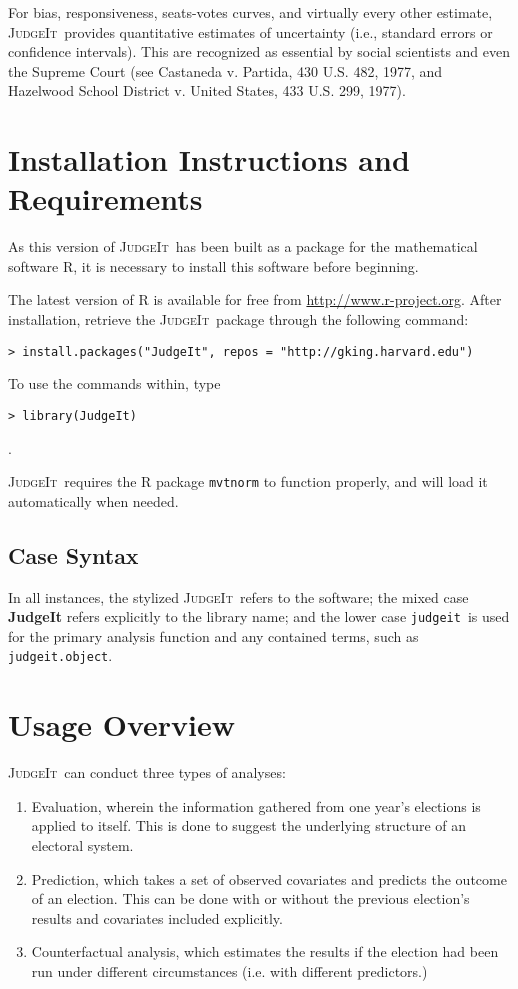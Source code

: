 \documentclass[oneside,letterpaper,titlepage]{article}
\newcommand{\JudgeIt}{\textsc{JudgeIt}\ }
\newcommand{\jud}{\texttt{judgeit}\ }
\begin{document}
For bias, responsiveness, seats-votes curves, and virtually every
other estimate, \JudgeIt provides quantitative estimates of uncertainty
(i.e., standard errors or confidence intervals).  This are recognized
as essential by social scientists and even the Supreme Court (see
Castaneda v.  Partida, 430 U.S. 482, 1977, and Hazelwood School
District v. United States, 433 U.S. 299, 1977).

\section{Installation Instructions and Requirements}

As this version of \JudgeIt has been built as a package for the
mathematical software R, it is necessary to install this software
before beginning.

The latest version of R is available for free from
\url{http://www.r-project.org}. After installation, retrieve the
\JudgeIt package through the following command:

\begin{verbatim}
> install.packages("JudgeIt", repos = "http://gking.harvard.edu")
\end{verbatim}

To use the commands within, type
\begin{verbatim}
> library(JudgeIt)
\end{verbatim}.

\JudgeIt requires the R package \texttt{mvtnorm} to function properly,
and will load it automatically when needed.

\subsection{Case Syntax}

In all instances, the stylized \JudgeIt refers to the software; the mixed case \textbf{JudgeIt} refers explicitly to the library name; and the lower case \jud is used for the primary analysis function and any contained terms,
such as \texttt{judgeit.object}.

\section{Usage Overview}

\JudgeIt can conduct three types of analyses:
\begin{enumerate}
\item Evaluation, wherein the information gathered from one year's
  elections is applied to itself. This is done to suggest the
  underlying structure of an electoral system.

\item Prediction, which takes a set of observed covariates and
  predicts the outcome of an election. This can be done with or
  without the previous election's results and covariates included explicitly.

\item Counterfactual analysis, which estimates the results if the
  election had been run under different circumstances (i.e. with
  different predictors.)
\end{enumerate}
\end{document}

